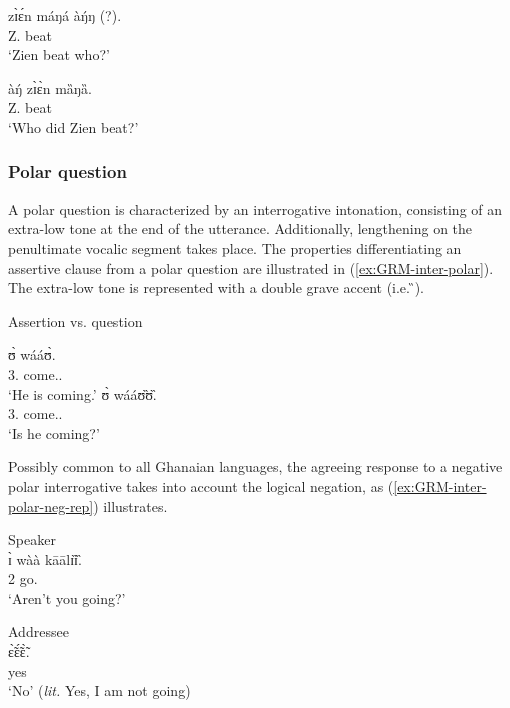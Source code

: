 \ea\label{ex:GRM-inter-content-who-rev-bear}

\begin{multicols}{2}
 \ea\label{ex:GRM-inter-content-who-rev-bear-in}
\gll  zɪ̀ɛ́n máŋá àŋ́ŋ (?).\\
 Z. beat {\q}\\
 \glt  `Zien beat who?'

 \ex\label{ex:GRM-inter-content-who-rev-bear-ex}
\gll  àŋ́ zɪ̀ɛ̀n mȁŋȁ.\\
{\q} Z. beat\\
 \glt  `Who did Zien beat?'

\z 
\end{multicols}
 \z





\subsubsection{Polar question}
\label{sec:GRM-interr-polar}

A polar question is characterized by an interrogative intonation, consisting of
an extra-low tone at the end of the utterance. Additionally, lengthening  on the
penultimate vocalic segment takes place. The properties differentiating an
assertive clause from a polar question are illustrated in
(\ref{ex:GRM-inter-polar}). The
extra-low tone is represented with a double grave accent (i.e.  ̏). 

\ea\label{ex:GRM-inter-polar}{\rm Assertion vs. question}\\

\begin{multicols}{2}
\ea
\gll ʊ̀ wááʊ̀.\\
{3.\sg} come.{\ipfv .\foc}\\
\glt  `He is coming.'
\ex 
\gll ʊ̀ wááʊ̏ʊ̏.\\
{3.\sg} come.{\ipfv .\foc}\\
\glt `Is he coming?'%

\z 
\end{multicols}
 \z

Possibly common to all Ghanaian languages, the  agreeing response
to a  negative polar interrogative
  takes into account the logical negation, as 
(\ref{ex:GRM-inter-polar-neg-rep}) illustrates. 



\ea\label{ex:GRM-inter-polar-neg-rep}

\begin{multicols}{2}
\ea\label{ex:GRM-inter-polar-neg-rep-S}{\rm Speaker}\\
\gll  ɪ̀ wàà kāālɪ̏ɪ̏.\\
{2\sg} {\neg} go.{\q}\\
\glt `Aren't you going?'

\ex\label{ex:GRM-inter-polar-neg-rep-A}{\rm Addressee}\\
\gll ɛ̃̀ɛ̃́ɛ̃̀.\\
yes\\
\glt `No' ({\it lit.} Yes, I am not going)


\z 
\end{multicols}
 \z

